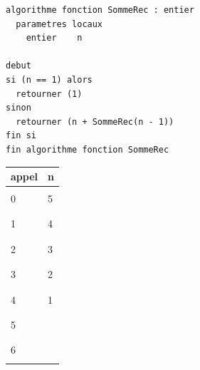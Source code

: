 \documentclass[11pt,a4paper]{article}
\begin{document}
\begin{table}[h!]
  \centering
  \begin{minipage}{0.5\textwidth}
    \centering
\begin{lstlisting}[style=algorithmique]
algorithme fonction SommeRec : entier
  parametres locaux
    entier    n

debut
si (n == 1) alors
  retourner (1)
sinon
  retourner (n + SommeRec(n - 1))
fin si
fin algorithme fonction SommeRec \end{lstlisting}
  \end{minipage}
  \hfillx
  \begin{minipage}{0.13\textwidth}
    \centering
    \begin{tabular}{|C{1cm}|C{1cm}|}
        \hline
        appel &  n  \\
        \hline
              &     \\
        0     &  5  \\
              &     \\
        \hline
              &     \\
        1     &  4  \\
              &     \\
        \hline
              &     \\
        2     &  3  \\
              &     \\
        \hline
              &     \\
        3     &  2  \\
              &     \\
        \hline
              &     \\
        4     &  1  \\
              &     \\
        \hline
              &     \\
        5     &     \\
              &     \\
        \hline
              &     \\
        6     &     \\
              &     \\
        \hline
    \end{tabular}

\end{minipage}
\end{table}
\end{document}
